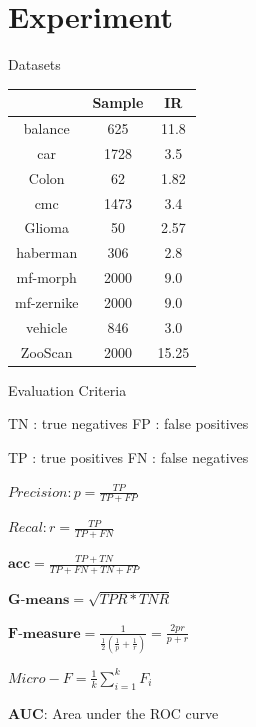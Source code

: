 \documentclass[10pt]{beamer}
\begin{document}
\section{Experiment}

\begin{frame}{Datasets}
 
\begin{table}[hb]
    \centering
    \begin{tabular}{c|c|c}
        \hline 
        			&Sample		&IR\\
        \hline
        balance		&625		&11.8\\
        \hline
        car			&1728		&3.5\\
        \hline
        Colon		&62			&1.82\\
        \hline
        cmc			&1473		&3.4\\
        \hline
        Glioma		&50			&2.57\\
        \hline
        haberman	&306		&2.8\\
        \hline
        mf-morph	&2000		&9.0\\
        \hline
        mf-zernike	&2000		&9.0\\
        \hline
        vehicle		&846		&3.0\\
        \hline
        ZooScan		&2000		&15.25\\
        \hline 
        
	
    \end{tabular}
    \label{tab:datasets}
\end{table}


\end{frame}


\begin{frame}{Evaluation Criteria}

TN : true negatives\qquad \qquad
FP : false positives

TP : true positives\qquad \qquad 
FN : false negatives

$Precision: p = \frac{TP}{TP+FP}$

$Recal: r = \frac{TP}{TP+FN}$

$\textbf{acc} = \frac{TP+TN}{TP+FN+TN+FP}$

$\textbf{G-means} = \sqrt{TPR*TNR}$

$\textbf{F-measure} = \frac{1}{\frac{1}{2}(\frac{1}{p}+\frac{1}{r})} = \frac{2pr}{p+r}$

$Micro-F = \frac{1}{k}\sum^{k}_{i=1}F_{i}$

\textbf{AUC}: Area under the ROC curve

\end{frame}
\end{document}
